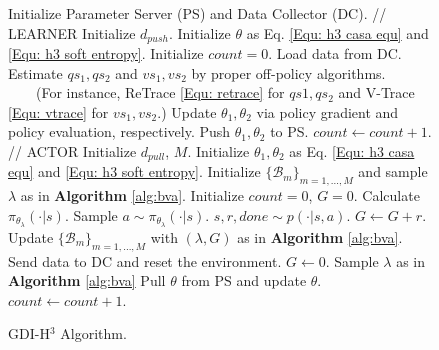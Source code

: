 \documentclass[nohyperref]{article}
\theoremstyle{plain}
\begin{document}
\begin{figure}[ht]
  \centering
  \begin{minipage}{.7\linewidth}
    \begin{algorithm}[H]
      \caption{GDI-H$^3$ Algorithm.}  
          \begin{algorithmic}
            \STATE Initialize Parameter Server (PS) and Data Collector (DC).
            \STATE
            \STATE // LEARNER
            \STATE Initialize $d_{push}$.
            \STATE Initialize $\theta$  as Eq. \eqref{Equ: h3 casa equ} and \eqref{Equ: h3 soft entropy}.
            \STATE Initialize $count = 0$.
                \STATE Load data from DC.
                \STATE Estimate $qs_1, qs_2$ and $vs_1, vs_2$ by proper off-policy algorithms.
                \STATE \ \ \ \ (For instance, ReTrace \eqref{Equ: retrace} for $qs1, qs_2$ and V-Trace \eqref{Equ: vtrace} for $vs_1, vs_2$.)
                \STATE Update $\theta_1, \theta_2$ via policy gradient and policy evaluation, respectively.
                    \STATE Push $\theta_1, \theta_2$ to PS.
                \ENDIF
                \STATE $count \leftarrow count + 1$.
            \ENDWHILE
            \STATE
            \STATE // ACTOR
            \STATE Initialize $d_{pull}$, $M$.
            \STATE Initialize $\theta_1, \theta_2$ as Eq. \eqref{Equ: h3 casa equ} and \eqref{Equ: h3 soft entropy}.
            \STATE Initialize $\{\mathcal{B}_m\}_{m=1,...,M}$ and sample $\lambda$ as in \textbf{Algorithm} \ref{alg:bva}.
            \STATE Initialize $count = 0$, $G = 0$.
                \STATE Calculate $\pi_{\theta_{\lambda}}(\cdot | s)$.
                \STATE Sample $a \sim \pi_{\theta_{\lambda}}(\cdot | s)$.
                \STATE $s, r, done \sim p(\cdot | s, a)$.
                \STATE $G \leftarrow G + r$.
                    \STATE Update $\{\mathcal{B}_m\}_{m=1,...,M}$ with $(\lambda, G)$ as in \textbf{Algorithm} \ref{alg:bva}.
                    \STATE Send data to DC and reset the environment.
                    \STATE $G \leftarrow 0$.
                    \STATE Sample $\lambda$ as in \textbf{Algorithm} \ref{alg:bva}
                \ENDIF
                    \STATE Pull $\theta$ from PS and update $\theta$.
                \ENDIF
                \STATE $count \leftarrow count + 1$.
            \ENDWHILE
          \end{algorithmic}
        \label{alg:h3}
    \end{algorithm}
  \end{minipage}
\end{figure}
\end{document}
